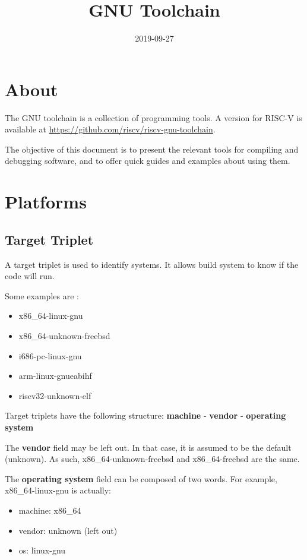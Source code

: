 \documentclass{article}
\title{GNU Toolchain}
\date{2019-09-27}
\begin{document}
	\maketitle
	
	\section{About}
	
	The GNU toolchain is a collection of programming tools. A version for RISC-V is available at \url{https://github.com/riscv/riscv-gnu-toolchain}.
	
	The objective of this document is to present the relevant tools for compiling and debugging software, and to offer quick guides and examples about using them.
	
	\newpage
	\section{Platforms}
	
	\subsection{Target Triplet}
	
	A target triplet is used to identify systems. It allows build system to know if the code will run.
	
	Some examples are :
	
	\vspace{-\topsep}
	\begin{itemize}
	\item x86\_64-linux-gnu
	\item x86\_64-unknown-freebsd
	\item i686-pc-linux-gnu
	\item arm-linux-gnueabihf
	\item riscv32-unknown-elf
	\end{itemize}
	
	Target triplets have the following structure: \textbf{machine} - \textbf{vendor} - \textbf{operating system}
	
	The \textbf{vendor} field may be left out. In that case, it is assumed to be the default (unknown). As such, x86\_64-unknown-freebsd and x86\_64-freebsd are the same.
	
	The \textbf{operating system} field can be composed of two words. For example, x86\_64-linux-gnu is actually:
	
	\vspace{-\topsep}
	\begin{itemize}
	\item machine: x86\_64
	\item vendor: unknown (left out)
	\item os: linux-gnu
	\end{itemize}
	
\end{document}
